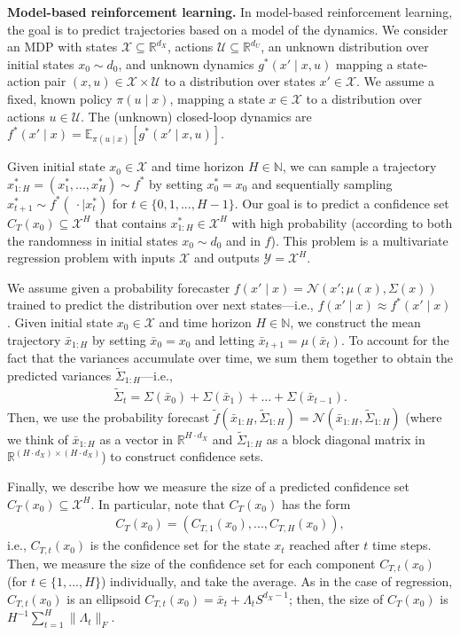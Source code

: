 \documentclass{article} \usepackage{iclr2020_conference,times}
\renewcommand{\(}						{\left(}
\renewcommand{\)}						{\right)}
\renewcommand{\[}						{\left[}
\renewcommand{\]}						{\right]}
\newcommand{\<}						{\left<}
\renewcommand{\>}						{\right>}
\begin{document}
\textbf{Model-based reinforcement learning.}
In model-based reinforcement learning, the goal is to predict trajectories based on a model of the dynamics. We consider an MDP with states $\mathcal{X}\subseteq\mathbb{R}^{d_X}$, actions $\mathcal{U}\subseteq\mathbb{R}^{d_U}$, an unknown distribution over initial states $x_0\sim d_0$, and unknown dynamics $g^*(x'\mid x,u)$ mapping a state-action pair $(x,u)\in\mathcal{X}\times\mathcal{U}$ to a distribution over states $x'\in\mathcal{X}$. We assume a fixed, known policy $\pi(u\mid x)$, mapping a state $x\in\mathcal{X}$ to a distribution over actions $u\in\mathcal{U}$. The (unknown) closed-loop dynamics are $f^*(x'\mid x)=\mathbb{E}_{\pi(u\mid x)}[g^*(x'\mid x,u)]$.


Given initial state $x_0\in\mathcal{X}$ and time horizon $H\in\mathbb{N}$, we can sample a trajectory $x_{1:H}^*=(x_1^*,...,x_H^*)\sim f^*$ by setting $x_0^*=x_0$ and sequentially sampling $x_{t+1}^*\sim f^*(~\cdot\mid x_t^*)$ for $t\in\{0,1,...,H-1\}$. Our goal is to predict a confidence set $C_T(x_0)\subseteq\mathcal{X}^H$ that contains $x_{1:H}^*\in\mathcal{X}^H$ with high probability (according to both the randomness in initial states $x_0\sim d_0$ and in $f$). This problem is a multivariate regression problem with inputs $\mathcal{X}$ and outputs $\mathcal{Y}=\mathcal{X}^H$.

We assume given a probability forecaster $f(x'\mid x)=\mathcal{N}(x';\mu(x),\Sigma(x))$ trained to predict the distribution over next states---i.e., $f(x'\mid x)\approx f^*(x'\mid x)$. Given initial state $x_0\in\mathcal{X}$ and time horizon $H\in\mathbb{N}$, we construct the mean trajectory $\bar{x}_{1:H}$ by setting $\bar{x}_0=x_0$ and letting $\bar{x}_{t+1}=\mu(\bar{x}_t)$. To account for the fact that the variances accumulate over time, we sum them together to obtain the predicted variances $\tilde\Sigma_{1:H}$---i.e.,
\begin{align*}
\tilde\Sigma_t=\Sigma(\bar{x}_0)+\Sigma(\bar{x}_1)+...+\Sigma(\bar{x}_{t-1}).
\end{align*}
Then, we use the probability forecast $\tilde{f}(\bar{x}_{1:H},\tilde\Sigma_{1:H})=\mathcal{N}(\bar{x}_{1:H},\tilde\Sigma_{1:H})$ (where we think of $\bar{x}_{1:H}$ as a vector in $\mathbb{R}^{H\cdot d_X}$ and $\tilde\Sigma_{1:H}$ as a block diagonal matrix in $\mathbb{R}^{(H\cdot d_X)\times(H\cdot d_X)}$) to construct confidence sets.

Finally, we describe how we measure the size of a predicted confidence set $C_T(x_0)\subseteq\mathcal{X}^H$. In particular, note that $C_T(x_0)$ has the form
\begin{align*}
C_T(x_0)=(C_{T,1}(x_0),...,C_{T,H}(x_0)),
\end{align*}
i.e., $C_{T,t}(x_0)$ is the confidence set for the state $x_t$ reached after $t$ time steps. Then, we measure the size of the confidence set for each component $C_{T,t}(x_0)$ (for $t\in\{1,...,H\}$) individually, and take the average. As in the case of regression, $C_{T,t}(x_0)$ is an ellipsoid $C_{T,t}(x_0)=\bar{x}_t+\Lambda_tS^{d_X-1}$; then, the size of $C_T(x_0)$ is
$H^{-1}\sum_{t=1}^H\|\Lambda_t\|_F$.
\end{document}
